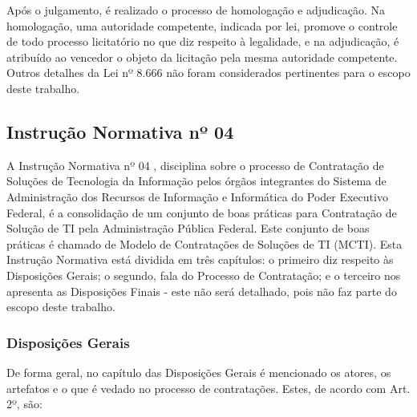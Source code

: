 Após o julgamento, é realizado o processo de homologação e adjudicação. Na homologação, uma autoridade competente, indicada por lei, promove o controle de todo processo licitatório no que diz respeito à legalidade, e na adjudicação, é atribuído ao vencedor o objeto da licitação pela mesma autoridade competente. Outros detalhes da Lei nº 8.666 não foram considerados pertinentes para o escopo deste trabalho.


\subsection[Instrução Normativa nº 04]{Instrução Normativa nº 04}

A Instrução Normativa nº 04 \cite{IN04:2010}, disciplina sobre o processo de Contratação de Soluções de Tecnologia da Informação pelos órgãos integrantes do Sistema de Administração dos Recursos de Informação e Informática do Poder  Executivo Federal, é a consolidação de um conjunto de boas práticas para Contratação de Solução de TI pela Administração Pública Federal. Este conjunto de boas práticas é chamado de Modelo de Contratações de Soluções de TI (MCTI). Esta Instrução Normativa está dividida em três capítulos: o primeiro diz respeito às Disposições Gerais; o segundo, fala do Processo de Contratação; e o terceiro nos apresenta as Disposições Finais - este não será detalhado, pois não faz parte do escopo deste trabalho.

\subsubsection[Disposições Gerais]{Disposições Gerais}

De forma geral, no capítulo das Disposições Gerais é mencionado os atores, os artefatos e o que é vedado no processo de contratações. Estes, de acordo com Art. 2º, são: 

